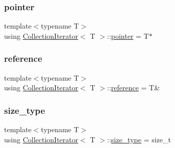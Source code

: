 \mbox{\label{class_collection_iterator_aff846a9c86022d66a7eb10e3623a0ba0}} 
\subsubsection{\texorpdfstring{pointer}{pointer}}
{\footnotesize\ttfamily template$<$typename T$>$ \\
using \hyperlink{class_collection_iterator}{Collection\+Iterator}$<$ T $>$\+::\hyperlink{class_collection_iterator_aff846a9c86022d66a7eb10e3623a0ba0}{pointer} =  T$\ast$}

\mbox{\label{class_collection_iterator_aac15417aa7a67fdfb86b8bad1b4d5ddf}} 
\subsubsection{\texorpdfstring{reference}{reference}}
{\footnotesize\ttfamily template$<$typename T$>$ \\
using \hyperlink{class_collection_iterator}{Collection\+Iterator}$<$ T $>$\+::\hyperlink{class_collection_iterator_aac15417aa7a67fdfb86b8bad1b4d5ddf}{reference} =  T\&}

\mbox{\label{class_collection_iterator_a1302f39e9a4763886e48a045e53c00cf}} 
\subsubsection{\texorpdfstring{size\+\_\+type}{size\_type}}
{\footnotesize\ttfamily template$<$typename T$>$ \\
using \hyperlink{class_collection_iterator}{Collection\+Iterator}$<$ T $>$\+::\hyperlink{class_collection_iterator_a1302f39e9a4763886e48a045e53c00cf}{size\+\_\+type} =  size\+\_\+t}

\mbox{\label{class_collection_iterator_a8513f3c29655e48f34f8b6a11b96a71b}} 
